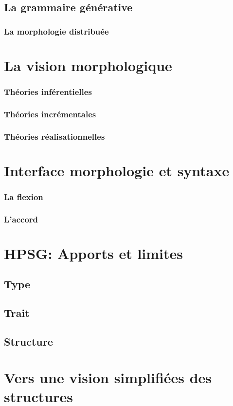 \documentclass[11pt,a4paper]{book}
\begin{document}
\section{La grammaire générative}
\subsection{La morphologie distribuée}
\chapter{La vision morphologique}
\subsection{Théories inférentielles}
\subsection{Théories incrémentales}
\subsection{Théories réalisationnelles}
\chapter{Interface morphologie et syntaxe}
\subsection{La flexion}
\subsection{L'accord}
\chapter{HPSG: Apports et limites}
\section{Type}
\section{Trait}
\section{Structure}
\chapter{Vers une vision simplifiées des structures}
\end{document}
